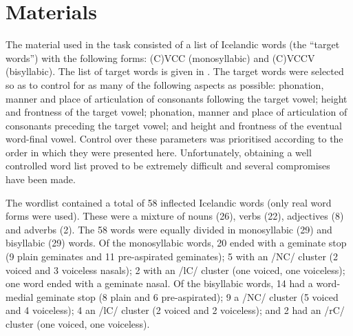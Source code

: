 \documentclass[11pt,a4paper,openany]{memoir}\usepackage[]{graphicx}\usepackage[]{color}
\begin{document}
\section{Materials}
\label{s:materials}
The material used in the task consisted of a list of Icelandic words (the ``target words'') with the following forms: (C)VCC (monosyllabic) and (C)VCCV (bisyllabic).
The list of target words is given in .
The target words were selected so as to control for as many of the following aspects as possible: phonation, manner and place of articulation of consonants following the target vowel; height and frontness of the target vowel; phonation, manner and place of articulation of consonants preceding the target vowel; and height and frontness of the eventual word-final vowel.
Control over these parameters was prioritised according to the order in which they were presented here.
Unfortunately, obtaining a well controlled word list proved to be extremely difficult and several compromises have been made.

The wordlist contained a total of 58 inflected Icelandic words (only real word forms were used).
These were a mixture of nouns (26), verbs (22), adjectives (8) and adverbs (2).
The 58 words were equally divided in monosyllabic (29) and bisyllabic (29) words.
Of the monosyllabic words, 20 ended with a geminate stop (9 plain geminates and 11 pre-aspirated geminates); 5 with an /NC/ cluster (2 voiced and 3 voiceless nasals); 2 with an /lC/ cluster (one voiced, one voiceless); one word ended with a geminate nasal.
Of the bisyllabic words, 14 had a word-medial geminate stop (8 plain and 6 pre-aspirated); 9 a /NC/ cluster (5 voiced and 4 voiceless); 4 an /lC/ cluster (2 voiced and 2 voiceless); and 2 had an /rC/ cluster (one voiced, one voiceless).


\vspace{5em}

\label{t:wordlist}
\end{document}
